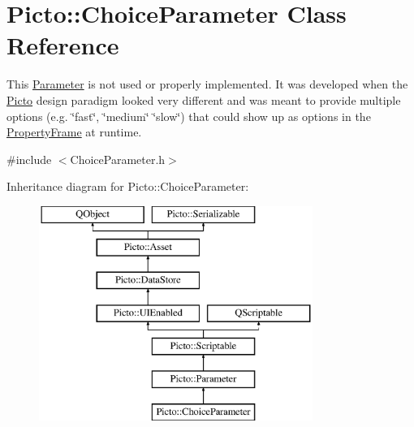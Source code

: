 \hypertarget{class_picto_1_1_choice_parameter}{\section{Picto\-:\-:Choice\-Parameter Class Reference}
\label{class_picto_1_1_choice_parameter}
}


This \hyperlink{class_picto_1_1_parameter}{Parameter} is not used or properly implemented. It was developed when the \hyperlink{namespace_picto}{Picto} design paradigm looked very different and was meant to provide multiple options (e.\-g. \char`\"{}fast\char`\"{}, \char`\"{}medium\char`\"{} \char`\"{}slow\char`\"{}) that could show up as options in the \hyperlink{class_property_frame}{Property\-Frame} at runtime.  




{\ttfamily \#include $<$Choice\-Parameter.\-h$>$}

Inheritance diagram for Picto\-:\-:Choice\-Parameter\-:\begin{figure}[H]
\begin{center}
\leavevmode
\includegraphics[height=7.000000cm]{class_picto_1_1_choice_parameter}
\end{center}
\end{figure}
